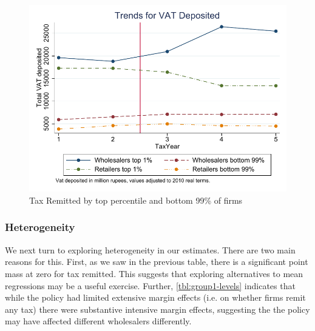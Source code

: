 
\begin{figure}[h] 
\centering
\includegraphics{graphs/MoneyDepositedTrendsTopPercentilePanel_Annual_Real.pdf}
\caption{Tax Remitted by top percentile and bottom 99\% of firms}
\label{fig:money-onepercentile}
\end{figure}

\subsubsection{Heterogeneity}
\label{subsubsec:diffindiff_heterogeneity}
We next turn to exploring heterogeneity in our estimates. There are two main reasons for this. First, as we saw in the previous table, there is a significant point mass at zero for tax remitted. This suggests that exploring alternatives to mean regressions may be a useful exercise. Further, \cref{tbl:group1-levels} indicates that while the policy had limited extensive margin effects (i.e. on whether firms remit any tax) there were substantive intensive margin effects, suggesting the the policy may have affected different wholesalers differently.


